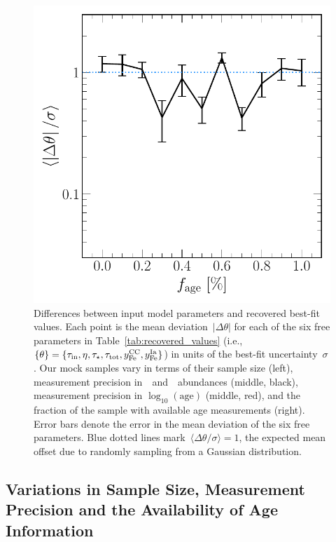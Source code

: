\documentclass[foo.tex]{subfiles}
\begin{document}
\begin{figure}
\includegraphics[scale = 0.42]{dp_sigma_agefrac.pdf}
\caption{
Differences between input model parameters and recovered best-fit values.
Each point is the mean deviation~$\left|\Delta\theta\right|$ for each of the
six free parameters in Table~\ref{tab:recovered_values} (i.e.,
$\{\theta\} = \{\tau_\text{in}, \eta, \tau_\star, \tau_\text{tot}, y_\text{Fe}^\text{CC},
y_\text{Fe}^\text{Ia}\}$) in units of the best-fit uncertainty~$\sigma$.
Our mock samples vary in terms of their sample size (left), measurement
precision in~\feh~and~\afe~abundances (middle, black), measurement precision in
$\log_{10}(\text{age})$ (middle, red), and the fraction of the sample with
available age measurements (right).
Error bars denote the error in the mean deviation of the six free parameters.
Blue dotted lines mark~$\langle \Delta \theta / \sigma \rangle = 1$, the
expected mean offset due to randomly sampling from a Gaussian distribution.
}
\label{fig:accuracy}
\end{figure}

\subsection{Variations in Sample Size, Measurement Precision and the
Availability of Age Information}
\label{sec:mocks:variations}
\end{document}
